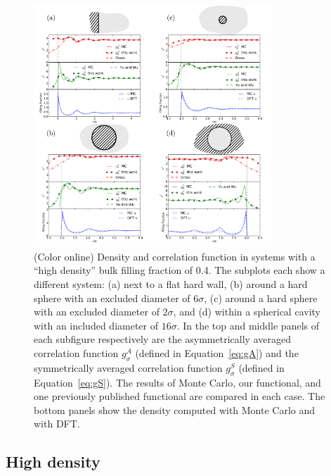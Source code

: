 \begin{figure}
  \noindent\includegraphics[width=0.8\textwidth]{figs/high-density}
  \caption{ (Color online) Density and correlation function in systems
    with a ``high density'' bulk filling fraction of 0.4.  The
    subplots each show a different system: (a) next to a flat hard wall, (b)
    around a hard sphere with an excluded diameter of $6\sigma$, (c)
    around a hard sphere with an excluded diameter of $2\sigma$, and
    (d) within a spherical cavity with an included diameter of $16\sigma$.
    In the top and middle panels of each subfigure respectively are the
    asymmetrically averaged correlation function $g_\sigma^A$ (defined
    in Equation~\ref{eq:gA}) and the symmetrically averaged
    correlation function $g_\sigma^S$ (defined in
    Equation~\ref{eq:gS}).  The results of Monte Carlo, our
    functional, and one previously published
    functional\cite{gross2009density,
      yu2002fmt-dft-inhomogeneous-associating} are compared in each
    case.  The bottom panels show the density computed with
    Monte Carlo and with DFT.}
  \label{fig:high-density}
\end{figure}

\subsection{High density}

